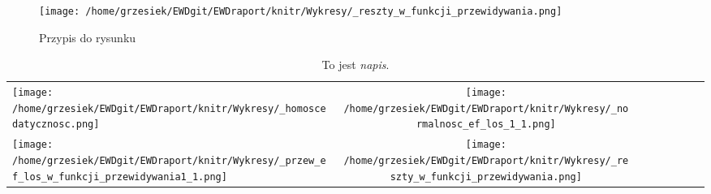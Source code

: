 \begin{figure} 
\texttt{[image: /home/grzesiek/EWDgit/EWDraport/knitr/Wykresy/\_reszty\_w\_funkcji\_przewidywania.png]} 
\caption*{Przypis do rysunku} 
\end{figure} 
 
\begin{table}[tb] 
\begin{tabularx}{\textwidth}{@{\hspace{1.7 mm}}Xccccccc@{\hspace{1.7 mm}}} 
\midrule 
   \texttt{[image: /home/grzesiek/EWDgit/EWDraport/knitr/Wykresy/\_homoscedatycznosc.png]} & \texttt{[image: /home/grzesiek/EWDgit/EWDraport/knitr/Wykresy/\_normalnosc\_ef\_los\_1\_1.png]} \\ 
   \texttt{[image: /home/grzesiek/EWDgit/EWDraport/knitr/Wykresy/\_przew\_ef\_los\_w\_funkcji\_przewidywania1\_1.png]} & \texttt{[image: /home/grzesiek/EWDgit/EWDraport/knitr/Wykresy/\_reszty\_w\_funkcji\_przewidywania.png]} \\ 
\end{tabularx} 
\caption*{ To jest \emph{napis}. } 
\end{table} 
 




